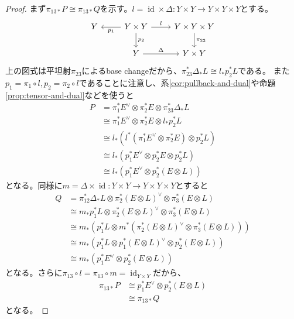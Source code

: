 \documentclass[uplatex, a4paper, dvipdfmx]{jsarticle}
\theoremstyle{definition}
\DeclareMathOperator{\id}{\mathrm{id}}
\begin{document}
\begin{proof}
    まず$\pi_{13*}P \cong \pi_{13*}Q$を示す。$l = \id \times \Delta \colon Y\times Y \to Y \times Y \times Y$とする。
    \[
        \begin{tikzcd}
            Y & Y \times Y \ar[l, "p_1"]\ar[r, "l"] \ar[d, "p_2"]& Y \times Y \times Y \ar[d, "\pi_{23}"]\\
            & Y \ar[r, "\Delta"] & Y \times Y
        \end{tikzcd}
    \]
    上の図式は平坦射$\pi_{23}$によるbase changeだから、$\pi_{23}^*\Delta_*L \cong l_*p_2^*L$である。
    また$p_1 = \pi_1 \circ l, p_2 = \pi_2 \circ l$であることに注意し、系\ref{cor:pullback-and-dual}や命題\ref{prop:tensor-and-dual}などを使うと
    \begin{align}
        P & =  \pi_1^*E^\vee \otimes \pi_2^* E \otimes \pi_{23}^*\Delta_*L \\
          & \cong  \pi_1^*E^\vee \otimes \pi_2^* E \otimes l_*p_2^*L       \\
          & \cong l_*(l^*(\pi_1^*E^\vee \otimes \pi_2^* E) \otimes p_2^*L) \\
          & \cong l_*(p_1^*E^\vee \otimes p_2^*E \otimes p_2^*L)           \\
          & \cong l_*(p_1^*E^\vee \otimes p_2^*(E \otimes L))
    \end{align}
    となる。同様に$m = \Delta \times \id \colon Y \times Y \to Y \times Y \times Y$とすると
    \begin{align}
        Q & = \pi_{12}^*\Delta_*L \otimes \pi_2^*(E \otimes L)^\vee \otimes \pi_3^* (E \otimes L)  \\
          & \cong m_*p_1^*L \otimes \pi_2^*(E \otimes L)^\vee \otimes \pi_3^* (E \otimes L)        \\
          & \cong m_*(p_1^*L \otimes m^*(\pi_2^*(E \otimes L)^\vee \otimes \pi_3^* (E \otimes L))) \\
          & \cong m_*(p_1^*L \otimes p_1^*(E \otimes L)^\vee \otimes p_2^* (E \otimes L))          \\
          & \cong m_*(p_1^*E^\vee \otimes p_2^* (E \otimes L))
    \end{align}
    となる。さらに$\pi_{13} \circ l = \pi_{13} \circ m = \id_{Y \times Y}$だから、
    \begin{align}
        \pi_{13*}P & \cong p_1^*E^\vee \otimes p_2^*(E \otimes L) \\
                   & \cong \pi_{13*}Q
    \end{align}
    となる。
\end{proof}

\printbibliography[title=参考文献]
\end{document}
